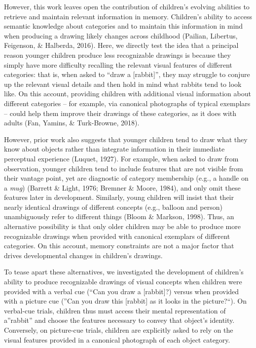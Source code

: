 \documentclass[
  man]{apa6}
\begin{document}
However, this work leaves open the contribution of children's evolving abilities to retrieve and maintain relevant information in memory. Children's ability to access semantic knowledge about categories and to maintain this information in mind when producing a drawing likely changes across childhood (Pailian, Libertus, Feigenson, \& Halberda, 2016). Here, we directly test the idea that a principal reason younger children produce less recognizable drawings is because they simply have more difficulty recalling the relevant visual features of different categories: that is, when asked to ``draw a {[}rabbit{]}'', they may struggle to conjure up the relevant visual details and then hold in mind what rabbits tend to look like. On this account, providing children with additional visual information about different categories -- for example, via canonical photographs of typical exemplars -- could help them improve their drawings of these categories, as it does with adults (Fan, Yamins, \& Turk-Browne, 2018).

However, prior work also suggests that younger children tend to draw what they know about objects rather than integrate information in their immediate perceptual experience (Luquet, 1927). For example, when asked to draw from observation, younger children tend to include features that are not visible from their vantage point, yet are diagnostic of category membership (e.g., a handle on a \textit{mug}) (Barrett \& Light, 1976; Bremner \& Moore, 1984), and only omit these features later in development. Similarly, young children will insist that their nearly identical drawings of different concepts (e.g., balloon and person) unambiguously refer to different things (Bloom \& Markson, 1998).
Thus, an alternative possibility is that only older children may be able to produce more recognizable drawings when provided with canonical exemplars of different categories.
On this account, memory constraints are not a major factor that drives developmental changes in children's drawings.

To tease apart these alternatives, we investigated the development of children's ability to produce recognizable drawings of visual concepts when children were provided with a verbal cue (``Can you draw a {[}rabbit{]}?) versus when provided with a picture cue (''Can you draw this {[}rabbit{]} as it looks in the picture?``). On verbal-cue trials, children thus must access their mental representation of a''rabbit'' and choose the features necessary to convey that object's identity. Conversely, on picture-cue trials, children are explicitly asked to rely on the visual features provided in a canonical photograph of each object category.
\end{document}
